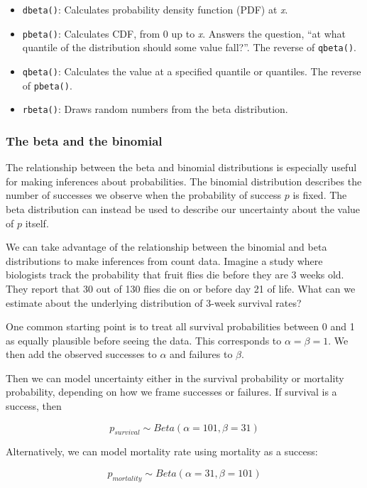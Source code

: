 \documentclass[
  13,
  letterpaper,
]{report}
\providecommand{\tightlist}{%
  \setlength{\itemsep}{0pt}\setlength{\parskip}{0pt}}
\begin{document}
\begin{itemize}
\tightlist
\item
  \texttt{dbeta()}: Calculates probability density function (PDF) at
  \emph{x}.
\item
  \texttt{pbeta()}: Calculates CDF, from 0 up to \emph{x}. Answers the
  question, ``at what quantile of the distribution should some value
  fall?''. The reverse of \texttt{qbeta()}.
\item
  \texttt{qbeta()}: Calculates the value at a specified quantile or
  quantiles. The reverse of \texttt{pbeta()}.
\item
  \texttt{rbeta()}: Draws random numbers from the beta distribution.
\end{itemize}

\subsubsection{The beta and the binomial}\label{sec-dist-beta-binom}

The relationship between the beta and binomial distributions is
especially useful for making inferences about probabilities. The
binomial distribution describes the number of successes we observe when
the probability of success \(p\) is fixed. The beta distribution can
instead be used to describe our uncertainty about the value of \(p\)
itself.

We can take advantage of the relationship between the binomial and beta
distributions to make inferences from count data. Imagine a study where
biologists track the probability that fruit flies die before they are 3
weeks old. They report that 30 out of 130 flies die on or before day 21
of life. What can we estimate about the underlying distribution of
3-week survival rates?

One common starting point is to treat all survival probabilities between
0 and 1 as equally plausible before seeing the data. This corresponds to
\(\alpha=\beta=1\). We then add the observed successes to \(\alpha\) and
failures to \(\beta\).

Then we can model uncertainty either in the survival probability or
mortality probability, depending on how we frame successes or failures.
If survival is a success, then

\[p_{survival}\sim{Beta\left(\alpha=101,\beta=31\right)}\]

Alternatively, we can model mortality rate using mortality as a success:

\[p_{mortality}\sim{Beta\left(\alpha=31,\beta=101\right)}\]
\end{document}
